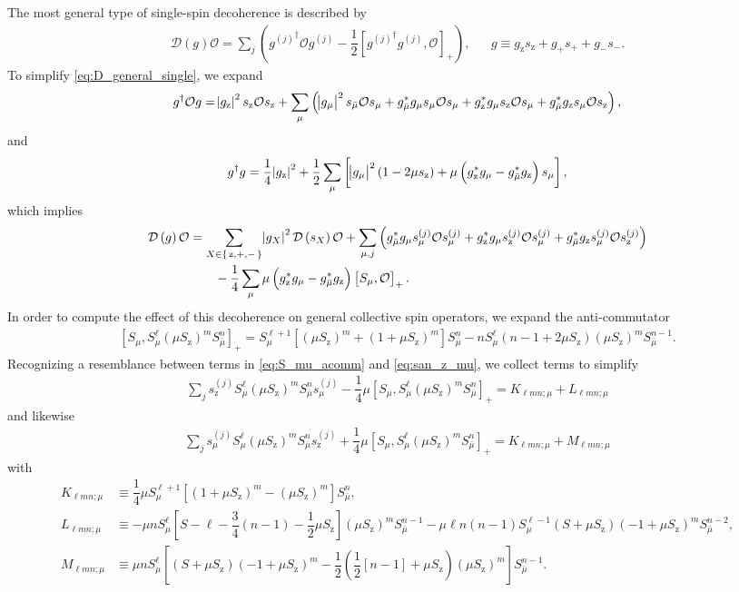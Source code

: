\documentclass[pra,twocolumn,longbibliography]{revtex4-2}
\newcommand{\f}[2]{\dfrac{#1}{#2}} %
\newcommand{\p}[1]{\left( #1 \right)} %
\renewcommand{\sp}[1]{\left[ #1 \right]} %
\newcommand{\D}{\mathcal{D}}
\renewcommand{\O}{\mathcal{O}}
\newcommand{\z}{\text{z}}
\newcommand{\bmu}{{\bar\mu}}
\newcommand{\1}{\mathds{1}}
\begin{document}
The most general type of single-spin decoherence is described by
\begin{align}
  \D\p{g} \O
  = \sum_j\p{{g^{(j)}}^\dag \O g^{(j)}
    - \f12\sp{{g^{(j)}}^\dag g^{(j)}, \O}_+},
  &&
  g \equiv g_\z s_\z + g_+ s_+ + g_- s_-.
  \label{eq:D_general_single}
\end{align}
To simplify \eqref{eq:D_general_single}, we expand
\begin{align}
  g^\dag \O g
  = \abs{g_\z}^2 s_\z \O s_\z
  + \sum_\mu \p{\abs{g_\mu}^2 s_\bmu \O s_\mu
    + g_\bmu^* g_\mu s_\mu \O s_\mu
    + g_\z^* g_\mu s_\z \O s_\mu
    + g_\bmu^* g_\z s_\mu \O s_\z},
\end{align}
and
\begin{align}
  g^\dag g
  = \f14 \abs{g_\z}^2
  + \f12 \sum_\mu \sp{\abs{g_\mu}^2 \p{1-2\mu s_\z}
    + \mu \p{g_\z^*g_\mu - g_\bmu^*g_\z} s_\mu},
\end{align}
which implies
\begin{align}
  \D\p{g} \O
  &= \sum_{X\in\set{\z,+,-}} \abs{g_X}^2 \D\p{s_X} \O
  + \sum_{\mu,j}
  \p{g_\bmu^* g_\mu s_\mu^{(j)} \O s_\mu^{(j)}
    + g_\z^* g_\mu s_\z^{(j)} \O s_\mu^{(j)}
    + g_\bmu^* g_\z s_\mu^{(j)} \O s_\z^{(j)}}
  \notag \\
  &\qquad -\f14 \sum_\mu \mu
  \p{g_\z^*g_\mu - g_\bmu^*g_\z} \sp{S_\mu, \O}_+.
\end{align}
In order to compute the effect of this decoherence on general
collective spin operators, we expand the anti-commutator
\begin{align}
  \sp{S_\mu, S_\mu^\ell \p{\mu S_\z}^m S_\bmu^n}_+
  = S_\mu^{\ell+1} \sp{\p{\mu S_\z}^m+\p{1+\mu S_\z}^m} S_\bmu^n
  - n S_\mu^\ell \p{n-1+2\mu S_\z} \p{\mu S_\z}^m S_\bmu^{n-1}.
  \label{eq:S_mu_acomm}
\end{align}
Recognizing a resemblance between terms in \eqref{eq:S_mu_acomm} and
\eqref{eq:san_z_mu}, we collect terms to simplify
\begin{align}
  \sum_j s_\z^{(j)} S_\mu^\ell \p{\mu S_\z}^m S_\bmu^n s_\mu^{(j)}
  - \f14 \mu \sp{S_\mu, S_\mu^\ell \p{\mu S_\z}^m S_\bmu^n}_+
  = K_{\ell mn;\mu} + L_{\ell mn;\mu}
  \label{eq:dec_z_mu}
\end{align}
and likewise
\begin{align}
  \sum_j s_\mu^{(j)} S_\mu^\ell \p{\mu S_\z}^m S_\bmu^n s_\z^{(j)}
  + \f14 \mu \sp{S_\mu, S_\mu^\ell \p{\mu S_\z}^m S_\bmu^n}_+
  = K_{\ell mn;\mu} + M_{\ell mn;\mu}
  \label{eq:dec_mu_z}
\end{align}
with
\begin{align}
  K_{\ell mn;\mu}
  &\equiv \f14 \mu S_\mu^{\ell+1}
  \sp{\p{1+\mu S_\z}^m-\p{\mu S_\z}^m} S_\bmu^n, \\
  L_{\ell mn;\mu}
  &\equiv -\mu n S_\mu^\ell \sp{S-\ell-\f34\p{n-1}-\f12\mu S_\z}
  \p{\mu S_\z}^m S_\bmu^{n-1}
  - \mu\ell n\p{n-1} S_\mu^{\ell-1}
  \p{S+\mu S_\z} \p{-1+\mu S_\z}^m S_\bmu^{n-2}, \\
  M_{\ell mn;\mu}
  &\equiv \mu n S_\mu^\ell \sp{\p{S+\mu S_\z}\p{-1+\mu S_\z}^m
    - \f12\p{\f12\sp{n-1}+\mu S_\z}\p{\mu S_\z}^m} S_\bmu^{n-1}.
\end{align}
\end{document}
